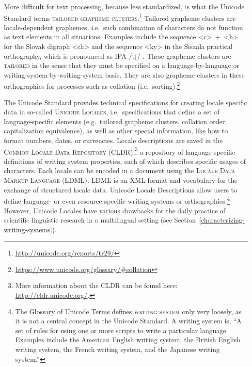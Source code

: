 More difficult for text processing, because less standardized, is what the
Unicode Standard terms \textsc{tailored grapheme clusters}.\footnote{\url{http://unicode.org/reports/tr29/}} 
Tailored grapheme clusters are locale-dependent graphemes, i.e.~such combination of characters do
not function as text elements in all situations. Examples include the sequence
<c>~+~<h> for the Slovak digraph <ch> and the sequence <ky> in the Sisaala
practical orthography, which is pronounced as IPA /tʃ/ \citep{Moran2006}. These grapheme
clusters are \textsc{tailored} in the sense that they must be specified on a
language-by-language or writing-system-by-writing-system basis. They are also 
grapheme clusters in these orthographies for processes such as collation (i.e.\ sorting).\footnote{\url{https://www.unicode.org/glossary/\#collation}}

The Unicode Standard provides technical specifications for creating locale specific data
in so-called \textsc{Unicode Locales}, i.e.~specifications 
that define a set of language-specific elements (e.g.~tailored grapheme
clusters, collation order, capitalization equivalence), as well as other special
information, like how to format numbers, dates, or currencies. Locale
descriptions are saved in the \textsc{Common Locale Data Repository
(CLDR)},\footnote{More information about the CLDR can be found here:
\url{http://cldr.unicode.org/}.} a repository of
language-specific definitions of writing system properties, each of which
describes specific usages of characters. Each locale can be encoded in a
document using the \textsc{Locale Data Markup Language (LDML)}. LDML is an XML
format and vocabulary for the exchange of structured locale data. Unicode Locale
Descriptions allow users to define language- or even resource-specific writing
systems or orthographies.\footnote{The Glossary of Unicode Terms defines \textsc{writing
system} only very loosely, as it is not a central concept in the Unicode
Standard. A writing system is, ``A set of rules for using one or more scripts to
write a particular language. Examples include the American English writing
system, the British English writing system, the French writing system, and the
Japanese writing system.''} However, Unicode Locales have various drawbacks 
for the daily practice of scientific linguistic research in a multilingual setting (see Section~\ref{characterizing-writing-systems}).
